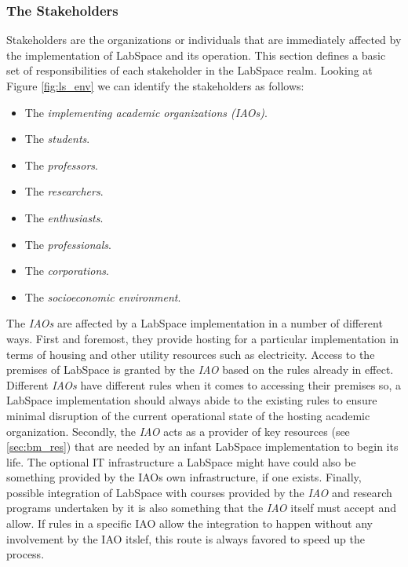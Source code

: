 \documentclass[a4paper, 11pt]{article}
\begin{document}
\subsubsection{The Stakeholders} \label{sec:bm_stakeholders}

Stakeholders are the organizations or individuals that are immediately affected by the implementation of LabSpace and its operation. This section defines a basic set of responsibilities of each stakeholder in the LabSpace realm. Looking at Figure \ref{fig:ls_env} we can identify the stakeholders as follows:

\begin{itemize}[noitemsep]
    \item The \textit{implementing academic organizations (IAOs)}.
    \item The \textit{students}.
    \item The \textit{professors}.
    \item The \textit{researchers}.
    \item The \textit{enthusiasts}.
    \item The \textit{professionals}.
    \item The \textit{corporations}.
    \item The \textit{socioeconomic environment}.
\end{itemize}

The \textit{IAOs} are affected by a LabSpace implementation in a number of different ways. First and foremost, they provide hosting for a particular implementation in terms of housing and other utility resources such as electricity. Access to the premises of LabSpace is granted by the \textit{IAO} based on the rules already in effect. Different \textit{IAOs} have different rules when it comes to accessing their premises so, a LabSpace implementation should always abide to the existing rules to ensure minimal disruption of the current operational state of the hosting academic organization. Secondly, the \textit{IAO} acts as a provider of key resources (see \ref{sec:bm_res}) that are needed by an infant LabSpace implementation to begin its life. The optional IT infrastructure a LabSpace might have could also be something provided by the IAOs own infrastructure, if one exists. Finally, possible integration of LabSpace with courses provided by the \textit{IAO} and research programs undertaken by it is also something that the \textit{IAO} itself must accept and allow. If rules in a specific IAO allow the integration to happen without any involvement by the IAO itslef, this route is always favored to speed up the process.
\end{document}
